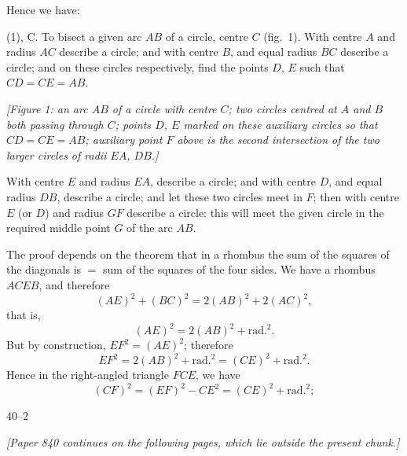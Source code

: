 \documentclass[11pt]{article}
\begin{document}
\medskip

Hence we have:

\medskip

(1), C. To bisect a given arc $AB$ of a circle, centre $C$ (fig.\ 1). With centre $A$ and radius $AC$ describe a circle; and with centre $B$, and equal radius $BC$ describe a circle; and on these circles respectively, find the points $D$, $E$ such that $CD = CE = AB$.

\medskip

\begin{center}
\textit{[Figure 1: an arc $AB$ of a circle with centre $C$; two circles centred at $A$ and $B$ both passing through $C$; points $D$, $E$ marked on these auxiliary circles so that $CD = CE = AB$; auxiliary point $F$ above is the second intersection of the two larger circles of radii $EA$, $DB$.]}
\end{center}

\medskip

With centre $E$ and radius $EA$, describe a circle; and with centre $D$, and equal radius $DB$, describe a circle; and let these two circles meet in $F$; then with centre $E$ (or $D$) and radius $GF$ describe a circle: this will meet the given circle in the required middle point $G$ of the arc $AB$.

\medskip

The proof depends on the theorem that in a rhombus the sum of the squares of the diagonals is $=$ sum of the squares of the four sides. We have a rhombus $ACEB$, and therefore
\[
(AE)^{2} + (BC)^{2} = 2(AB)^{2} + 2(AC)^{2},
\]
that is,
\[
(AE)^{2} = 2(AB)^{2} + \text{rad.}^{2}.
\]
But by construction, $EF^{2} = (AE)^{2}$; therefore
\[
EF^{2} = 2(AB)^{2} + \text{rad.}^{2} = (CE)^{2} + \text{rad.}^{2}.
\]
Hence in the right-angled triangle $FCE$, we have
\[
(CF)^{2} = (EF)^{2} - CE^{2} = (CE)^{2} + \text{rad.}^{2};
\]

\bigskip

\hfill 40--2

\medskip

\noindent\textit{[Paper 840 continues on the following pages, which lie outside the present chunk.]}
\end{document}
